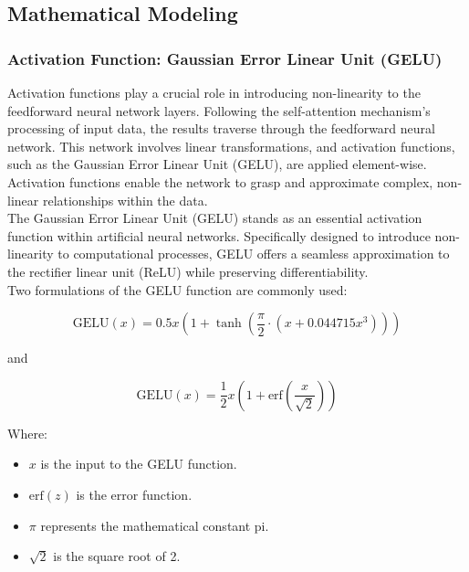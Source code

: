 \subsection{Mathematical Modeling}

\subsubsection{Activation Function: Gaussian Error Linear Unit (GELU)}
Activation functions play a crucial role in introducing non-linearity to the feedforward neural network layers. Following the self-attention mechanism's processing of input data, the results traverse through the feedforward neural network. This network involves linear transformations, and activation functions, such as the Gaussian Error Linear Unit (GELU), are applied element-wise. Activation functions enable the network to grasp and approximate complex, non-linear relationships within the data.\\

The Gaussian Error Linear Unit (GELU) stands as an essential activation function within artificial neural networks. Specifically designed to introduce non-linearity to computational processes, GELU offers a seamless approximation to the rectifier linear unit (ReLU) while preserving differentiability.\\

Two formulations of the GELU function are commonly used:

\begin{equation}
    \text{GELU}(x) = 0.5x \left(1 + \tanh\left(\frac{\pi}{2} \cdot \left(x + 0.044715x^3\right)\right)\right) \label{eq:gelu}
\end{equation}

and

\begin{equation}
    \text{GELU}(x) = \frac{1}{2}x \left(1 + \text{erf}\left(\frac{x}{\sqrt{2}}\right)\right) \label{eq:gelu2}
\end{equation}

Where:
\begin{itemize}
    \item $x$ is the input to the GELU function.
    \item $\text{erf}(z)$ is the error function.
    \item $\pi$ represents the mathematical constant pi.
    \item $\sqrt{2}$ is the square root of 2.
\end{itemize}

